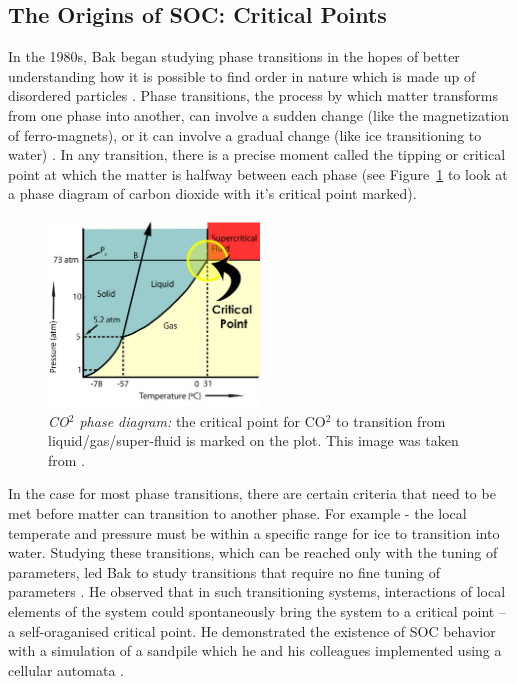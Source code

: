 \documentclass{book}
\begin{document}
\subsection{The Origins of SOC: Critical Points}
In the 1980s, Bak began studying phase transitions in the hopes of better understanding how it is possible to find order in nature which is made up of disordered particles \cite{MindSandWeb}. Phase transitions, the process by which matter transforms from one phase into another, can involve a sudden change (like the magnetization of ferro-magnets), or it can involve a gradual change (like ice transitioning to water) \cite{PhaseTransitionInfo}. In any transition, there is a precise moment called the tipping or critical point at which the matter is halfway between each phase (see Figure~\ref{fig:critPoint} to look at a phase diagram of carbon dioxide with it's critical point marked).

\begin{figure}[h]
	\centering
	\includegraphics[width=0.5\textwidth]{Figures/Intro/SandPileFigs/critical_co2}
	\caption[CO$^2$ phase diagram]{
\textit{CO$^2$ phase diagram:} the critical point for CO$^2$ to transition from liquid/gas/super-fluid is marked on the plot. This image was taken from \cite{IMGCriticalPoint}. 
}
	\label{fig:critPoint}
\end{figure}


 In the case for most phase transitions, there are certain criteria that need to be met before matter can transition to another phase. For example - the local temperate and pressure must be within a specific range for ice to transition into water. Studying these transitions, which can be reached only with the tuning of parameters, led Bak to study transitions that require no fine tuning of parameters \cite{MindSandWeb}. He observed that in such transitioning systems, interactions of local elements of the system could spontaneously bring the system to a critical point -- a self-oraganised critical point. He demonstrated the existence of SOC behavior with a simulation of a sandpile which he and his colleagues implemented using a cellular automata \cite{OGperBak1987}. 
\end{document}
